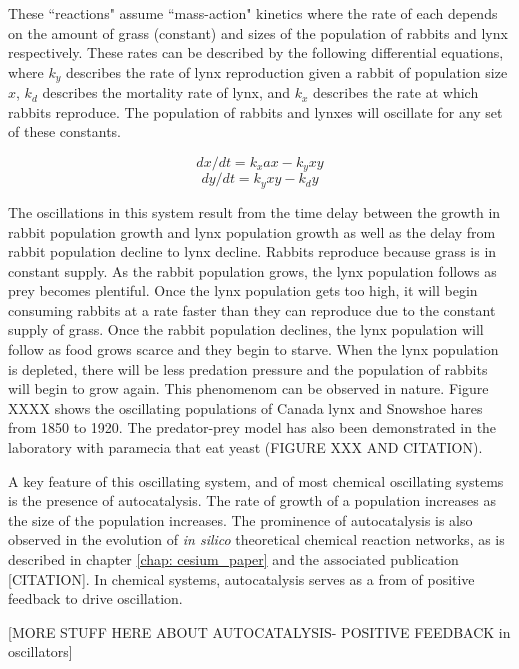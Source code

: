 \documentclass[12pt]{report}
\begin{document}
These ``reactions" assume ``mass-action" kinetics where the rate of each depends on the amount of grass (constant) and sizes of the population of rabbits and lynx respectively. These rates can be described by the following differential equations, where ${k_{y}}$ describes the rate of lynx reproduction given a rabbit of population size ${x}$, ${k_{d}}$ describes the mortality rate of lynx, and ${k_{x}}$ describes the rate at which rabbits reproduce. The population of rabbits and lynxes will oscillate for any set of these constants.

\begin{equation}
dx/dt = k_{x}ax - k_{y}xy
\end{equation}
\begin{equation}
dy/dt = k_{y}xy - k_{d}y
\end{equation}

The oscillations in this system result from the time delay between the growth in rabbit population growth and lynx population growth as well as the delay from rabbit population decline to lynx decline. Rabbits reproduce because grass is in constant supply. As the rabbit population grows, the lynx population follows as prey becomes plentiful. Once the lynx population gets too high, it will begin consuming rabbits at a rate faster than they can reproduce due to the constant supply of grass. Once the rabbit population declines, the lynx population will follow as food grows scarce and they begin to starve. When the lynx population is depleted, there will be less predation pressure and the population of rabbits will begin to grow again. This phenomenom can be observed in nature. Figure XXXX shows the oscillating populations of Canada lynx and Snowshoe hares from 1850 to 1920. The predator-prey model has also been demonstrated in the laboratory with paramecia that eat yeast (FIGURE XXX AND CITATION).

A key feature of this oscillating system, and of most chemical oscillating systems is the presence of autocatalysis. The rate of growth of a population increases as the size of the population increases. The prominence of autocatalysis is also observed in the evolution of \textit{in silico} theoretical chemical reaction networks, as is described in chapter \ref{chap: cesium_paper} and the associated publication [CITATION]. In chemical systems, autocatalysis serves as a from of positive feedback to drive oscillation.

[MORE STUFF HERE ABOUT AUTOCATALYSIS- POSITIVE FEEDBACK in oscillators]
\end{document}
